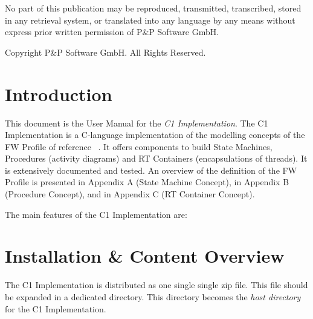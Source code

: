 \documentclass[a4paper,10pt]{article}
\let\stdsection\section
\renewcommand\section{\newpage\stdsection}
\begin{document}
\newpage
\tableofcontents

\newpage
\listoffigures
\listoftables
\lstlistoflistings

\newpage
\vspace*{\fill}
\begin{center}
No part of this publication may be reproduced, transmitted, transcribed, stored in any retrieval system, or translated into any language
by any means without express prior written permission of P\&P Software GmbH.
\end{center}

\begin{center}
Copyright  P\&P Software GmbH. All Rights Reserved. 
\end{center}
\vspace*{\fill}

\setlength{\parskip}{3mm}						%

\section{Introduction}
This document is the User Manual for the \emph{C1 Implementation}. 
The C1 Implementation is a C-language implementation of the modelling concepts of the FW Profile of reference ~\cite{ref:fwprofile}. It offers components to build State Machines, Procedures (activity diagrams) and RT Containers (encapsulations of threads). It is extensively documented and tested. An overview of the definition of the FW Profile is presented in Appendix A (State Machine Concept), in Appendix B (Procedure Concept), and in Appendix C (RT Container Concept).  

The main features of the C1 Implementation are:




\section{Installation \& Content Overview}
The C1 Implementation is distributed as one single single zip file. This file should be expanded in a dedicated directory. This directory becomes the \emph{host directory} for the C1 Implementation.
\end{document}
